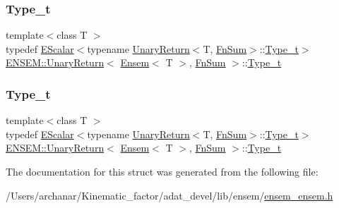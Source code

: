 \subsubsection{\texorpdfstring{Type\_t}{Type\_t}\hspace{0.1cm}{\footnotesize\ttfamily [1/2]}}
{\footnotesize\ttfamily template$<$class T $>$ \\
typedef \mbox{\hyperlink{classENSEM_1_1EScalar}{E\+Scalar}}$<$typename \mbox{\hyperlink{structENSEM_1_1UnaryReturn}{Unary\+Return}}$<$T, \mbox{\hyperlink{structENSEM_1_1FnSum}{Fn\+Sum}}$>$\+::\mbox{\hyperlink{structENSEM_1_1UnaryReturn_3_01Ensem_3_01T_01_4_00_01FnSum_01_4_ad99eb2820cca4a76378ee89c9abbf4e3}{Type\+\_\+t}}$>$ \mbox{\hyperlink{structENSEM_1_1UnaryReturn}{E\+N\+S\+E\+M\+::\+Unary\+Return}}$<$ \mbox{\hyperlink{classENSEM_1_1Ensem}{Ensem}}$<$ T $>$, \mbox{\hyperlink{structENSEM_1_1FnSum}{Fn\+Sum}} $>$\+::\mbox{\hyperlink{structENSEM_1_1UnaryReturn_3_01Ensem_3_01T_01_4_00_01FnSum_01_4_ad99eb2820cca4a76378ee89c9abbf4e3}{Type\+\_\+t}}}

\mbox{\label{structENSEM_1_1UnaryReturn_3_01Ensem_3_01T_01_4_00_01FnSum_01_4_ad99eb2820cca4a76378ee89c9abbf4e3}} 
\subsubsection{\texorpdfstring{Type\_t}{Type\_t}\hspace{0.1cm}{\footnotesize\ttfamily [2/2]}}
{\footnotesize\ttfamily template$<$class T $>$ \\
typedef \mbox{\hyperlink{classENSEM_1_1EScalar}{E\+Scalar}}$<$typename \mbox{\hyperlink{structENSEM_1_1UnaryReturn}{Unary\+Return}}$<$T, \mbox{\hyperlink{structENSEM_1_1FnSum}{Fn\+Sum}}$>$\+::\mbox{\hyperlink{structENSEM_1_1UnaryReturn_3_01Ensem_3_01T_01_4_00_01FnSum_01_4_ad99eb2820cca4a76378ee89c9abbf4e3}{Type\+\_\+t}}$>$ \mbox{\hyperlink{structENSEM_1_1UnaryReturn}{E\+N\+S\+E\+M\+::\+Unary\+Return}}$<$ \mbox{\hyperlink{classENSEM_1_1Ensem}{Ensem}}$<$ T $>$, \mbox{\hyperlink{structENSEM_1_1FnSum}{Fn\+Sum}} $>$\+::\mbox{\hyperlink{structENSEM_1_1UnaryReturn_3_01Ensem_3_01T_01_4_00_01FnSum_01_4_ad99eb2820cca4a76378ee89c9abbf4e3}{Type\+\_\+t}}}



The documentation for this struct was generated from the following file\+:\begin{DoxyCompactItemize}
\item 
/\+Users/archanar/\+Kinematic\+\_\+factor/adat\+\_\+devel/lib/ensem/\mbox{\hyperlink{lib_2ensem_2ensem__ensem_8h}{ensem\+\_\+ensem.\+h}}\end{DoxyCompactItemize}
